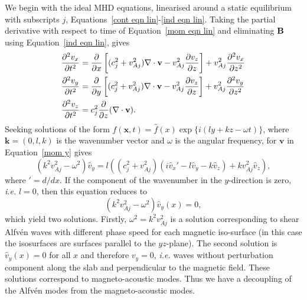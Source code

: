 We begin with the ideal MHD equations, linearised around a static equilibrium with subscripts $j$, Equations~\eqref{cont eqn lin}-\eqref{ind eqn lin}. Taking the partial derivative with respect to time of Equation~\eqref{mom eqn lin} and eliminating $\mathbf{B}$ using Equation~\eqref{ind eqn lin}, gives
\begin{align}
	\frac{\partial^2 v_x}{\partial t^2} &= \frac{\partial}{\partial x}\left[ (c_j^2 + v_{Aj}^2)\nabla\cdot\mathbf{v} - v_{Aj}^2\frac{\partial v_z}{\partial z} \right] + v_{Aj}^2 \frac{\partial^2 v_x}{\partial z^2} \label{mom x} \\
	\frac{\partial^2 v_y}{\partial t^2} &= \frac{\partial}{\partial y}\left[ (c_j^2 + v_{Aj}^2)\nabla\cdot\mathbf{v} - v_{Aj}^2\frac{\partial v_z}{\partial z} \right] + v_{Aj}^2 \frac{\partial^2 v_y}{\partial z^2} \label{mom y} \\
	\frac{\partial^2 v_z}{\partial t^2} &= c_j^2\frac{\partial}{\partial z}(\nabla\cdot\mathbf{v}). \label{mom z}
\end{align}
Seeking solutions of the form $f(\mathbf{x},t) = \widehat{f}(x) \exp\{i(ly + kz - \omega t)\}$, where $\mathbf{k} = (0, l, k)$ is the wavenumber vector and $\omega$ is the angular frequency, for $\mathbf{v}$ in Equation~\eqref{mom y} gives
\begin{equation}
(k^2v_{Aj}^2 - \omega^2)\widehat{v}_y = l((c_j^2 + v_{Aj}^2)(i\widehat{v}_x' - l\widehat{v}_y - k\widehat{v}_z) + kv_{Aj}^2\widehat{v}_z),
\end{equation}
where $' = d/dx$. If the component of the wavenumber in the $y$-direction is zero, \textit{i.e.} $l = 0$, then this equation reduces to
\begin{equation}
(k^2v_{Aj}^2 - \omega^2)\widehat{v}_y(x) = 0,
\end{equation}
which yield two solutions. Firstly, $\omega^2 = k^2v_{Aj}^2$ is a solution corresponding to shear Alfv\'{e}n waves with different phase speed for each magnetic iso-surface (in this case the isosurfaces are surfaces parallel to the $yz$-plane). The second solution is $\widehat{v}_y(x) = 0$ for all $x$ and therefore $v_y = 0$, \textit{i.e.} waves without perturbation component along the slab and perpendicular to the magnetic field. These solutions correspond to magneto-acoustic modes. Thus we have a decoupling of the Alfv\'{e}n modes from the magneto-acoustic modes.

